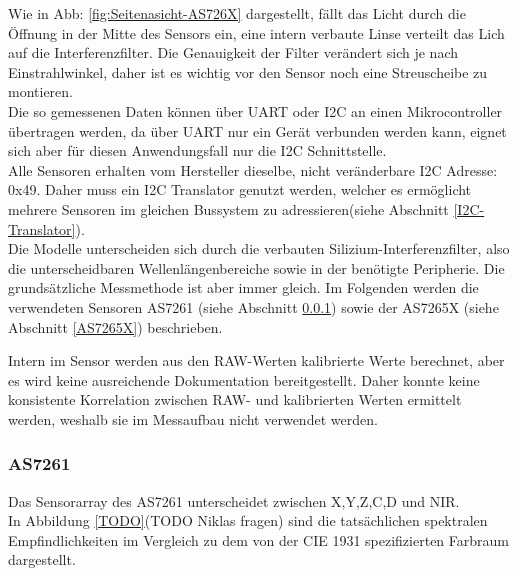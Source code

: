 \noindent Wie in Abb: \ref{fig:Seitenasicht-AS726X} dargestellt, fällt das Licht durch die Öffnung in der Mitte des Sensors ein, eine intern verbaute Linse verteilt das Lich auf die Interferenzfilter. Die Genauigkeit der Filter verändert sich je nach Einstrahlwinkel, daher ist es wichtig vor den Sensor noch eine Streuscheibe zu montieren.\\
Die so gemessenen Daten können über UART oder I2C an einen Mikrocontroller übertragen werden, da über UART nur ein Gerät verbunden werden kann, eignet sich aber für diesen Anwendungsfall nur die I2C Schnittstelle.\\
Alle Sensoren erhalten vom Hersteller dieselbe, nicht veränderbare I2C Adresse: 0x49. Daher muss ein I2C Translator genutzt werden, welcher es ermöglicht mehrere Sensoren im gleichen Bussystem zu adressieren(siehe Abschnitt \ref{I2C-Translator}).\\


\noindent Die Modelle unterscheiden sich durch die verbauten Silizium-Interferenzfilter, also die unterscheidbaren Wellenlängenbereiche sowie in der benötigte Peripherie.
Die grundsätzliche Messmethode ist aber immer gleich.
Im Folgenden werden die verwendeten Sensoren AS7261 (siehe Abschnitt \ref{AS7261}) sowie der AS7265X (siehe Abschnitt \ref{AS7265X}) beschrieben.

\noindent Intern im Sensor werden aus den RAW-Werten kalibrierte Werte berechnet, aber es wird keine ausreichende Dokumentation bereitgestellt.
Daher konnte keine konsistente Korrelation zwischen RAW- und kalibrierten Werten ermittelt werden, weshalb sie im Messaufbau nicht verwendet werden.


\newpage
\subsubsection{AS7261}\label{AS7261}
Das Sensorarray des AS7261 unterscheidet zwischen X,Y,Z,C,D und NIR.\\
In Abbildung \ref{TODO}(TODO Niklas fragen) sind die tatsächlichen spektralen Empfindlichkeiten im Vergleich zu dem von der CIE 1931 spezifizierten Farbraum dargestellt.


